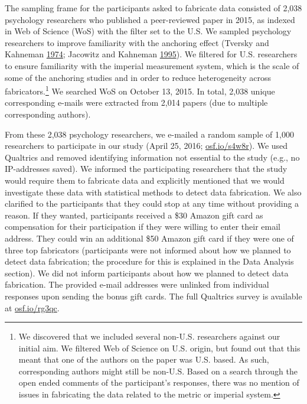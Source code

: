 \documentclass[a5paper]{book}
\let\rmarkdownfootnote\footnote%
\def\footnote{\protect\rmarkdownfootnote}
\begin{document}
The sampling frame for the participants asked to fabricate data
consisted of 2,038 psychology researchers who published a peer-reviewed
paper in 2015, as indexed in Web of Science (WoS) with the filter set to
the U.S. We sampled psychology researchers to improve familiarity with
the anchoring effect (Tversky and Kahneman
\protect\hyperlink{ref-doi:10.1126ux2fscience.185.4157.1124}{1974};
Jacowitz and Kahneman
\protect\hyperlink{ref-doi:10.1037ux2fe722982011-058}{1995}). We
filtered for U.S. researchers to ensure familiarity with the imperial
measurement system, which is the scale of some of the anchoring studies
and in order to reduce heterogeneity across fabricators.\footnote{We
  discovered that we included several non-U.S. researchers against our
  initial aim. We filtered Web of Science on U.S. origin, but found out
  that this meant that one of the authors on the paper was U.S. based.
  As such, corresponding authors might still be non-U.S. Based on a
  search through the open ended comments of the participant's responses,
  there was no mention of issues in fabricating the data related to the
  metric or imperial system.} We searched WoS on October 13, 2015. In
total, 2,038 unique corresponding e-mails were extracted from 2,014
papers (due to multiple corresponding authors).

From these 2,038 psychology researchers, we e-mailed a random sample of
1,000 researchers to participate in our study (April 25, 2016;
\href{https://osf.io/s4w8r}{osf.io/s4w8r}). We used Qualtrics and
removed identifying information not essential to the study (e.g., no
IP-addresses saved). We informed the participating researchers that the
study would require them to fabricate data and explicitly mentioned that
we would investigate these data with statistical methods to detect data
fabrication. We also clarified to the participants that they could stop
at any time without providing a reason. If they wanted, participants
received a \$30 Amazon gift card as compensation for their participation
if they were willing to enter their email address. They could win an
additional \$50 Amazon gift card if they were one of three top
fabricators (participants were not informed about how we planned to
detect data fabrication; the procedure for this is explained in the Data
Analysis section). We did not inform participants about how we planned
to detect data fabrication. The provided e-mail addresses were unlinked
from individual responses upon sending the bonus gift cards. The full
Qualtrics survey is available at
\href{https://osf.io/rg3qc}{osf.io/rg3qc}.
\end{document}

